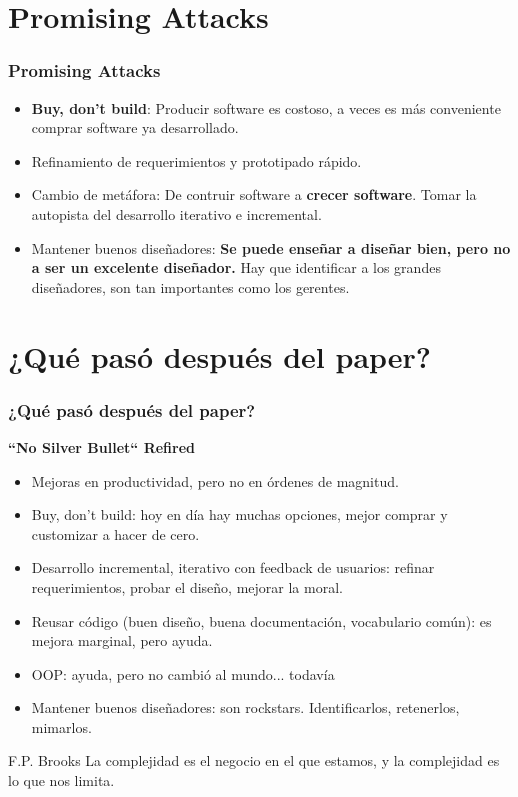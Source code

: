 \documentclass{beamer}
\begin{document}
\section{Promising Attacks}
\begin{frame}
  \frametitle{Promising Attacks}
  \begin{itemize}
    \item \textbf{Buy, don't build}: Producir software es costoso, a veces es más conveniente comprar software ya desarrollado.
    \item Refinamiento de requerimientos y prototipado rápido.
    \item Cambio de metáfora: De contruir software a \textbf{crecer software}. Tomar la autopista del desarrollo iterativo e incremental.
    \item Mantener buenos diseñadores: \textbf{Se puede enseñar a diseñar bien, pero no a ser un excelente diseñador.} Hay que identificar a los grandes diseñadores, son tan importantes como los gerentes.
  \end{itemize}
\end{frame}


\section{¿Qué pasó después del paper?}
\begin{frame}
  \frametitle{¿Qué pasó después del paper?}
  \textbf{``No Silver Bullet`` Refired}
  \begin{itemize}
    \item Mejoras en productividad, pero no en órdenes de magnitud.
    \item Buy, don't build: hoy en día hay muchas opciones, mejor comprar y customizar a hacer de cero.
    \item Desarrollo incremental, iterativo con feedback de usuarios: refinar requerimientos, probar el diseño, mejorar la moral.
    \item Reusar código (buen diseño, buena documentación, vocabulario común): es mejora marginal, pero ayuda.
    \item OOP: ayuda, pero no cambió al mundo... todavía
    \item Mantener buenos diseñadores: son rockstars. Identificarlos, retenerlos, mimarlos.
  \end{itemize}
  
  \begin{block}{F.P. Brooks}
La complejidad es el negocio en el que estamos, y la complejidad es lo que nos limita.
  \end{block}

\end{frame}
\end{document}

